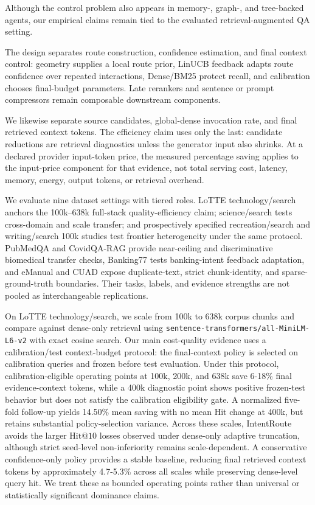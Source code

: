 Although the control problem also appears in memory-, graph-, and tree-backed agents, our empirical claims remain tied to the evaluated retrieval-augmented QA setting.

The design separates route construction, confidence estimation, and final context control: geometry supplies a local route prior, LinUCB feedback adapts route confidence over repeated interactions, Dense/BM25 protect recall, and calibration chooses final-budget parameters. Late rerankers and sentence or prompt compressors remain composable downstream components.

We likewise separate source candidates, global-dense invocation rate, and final retrieved context tokens. The efficiency claim uses only the last: candidate reductions are retrieval diagnostics unless the generator input also shrinks. At a declared provider input-token price, the measured percentage saving applies to the input-price component for that evidence, not total serving cost, latency, memory, energy, output tokens, or retrieval overhead.

We evaluate nine dataset settings with tiered roles. LoTTE technology/search anchors the 100k--638k full-stack quality-efficiency claim; science/search tests cross-domain and scale transfer; and prospectively specified recreation/search and writing/search 100k studies test frontier heterogeneity under the same protocol. PubMedQA and CovidQA-RAG provide near-ceiling and discriminative biomedical transfer checks, Banking77 tests banking-intent feedback adaptation, and eManual and CUAD expose duplicate-text, strict chunk-identity, and sparse-ground-truth boundaries. Their tasks, labels, and evidence strengths are not pooled as interchangeable replications.

On LoTTE technology/search, we scale from 100k to 638k corpus chunks and compare against dense-only retrieval using \nolinkurl{sentence-transformers/all-MiniLM-L6-v2} with exact cosine search. Our main cost-quality evidence uses a calibration/test context-budget protocol: the final-context policy is selected on calibration queries and frozen before test evaluation. Under this protocol, calibration-eligible operating points at 100k, 200k, and 638k save 6-18\% final evidence-context tokens, while a 400k diagnostic point shows positive frozen-test behavior but does not satisfy the calibration eligibility gate. A normalized five-fold follow-up yields 14.50\% mean saving with no mean Hit change at 400k, but retains substantial policy-selection variance. Across these scales, IntentRoute avoids the larger $\mathrm{Hit@10}$ losses observed under dense-only adaptive truncation, although strict seed-level non-inferiority remains scale-dependent. A conservative confidence-only policy provides a stable baseline, reducing final retrieved context tokens by approximately 4.7-5.3\% across all scales while preserving dense-level query hit. We treat these as bounded operating points rather than universal or statistically significant dominance claims.

